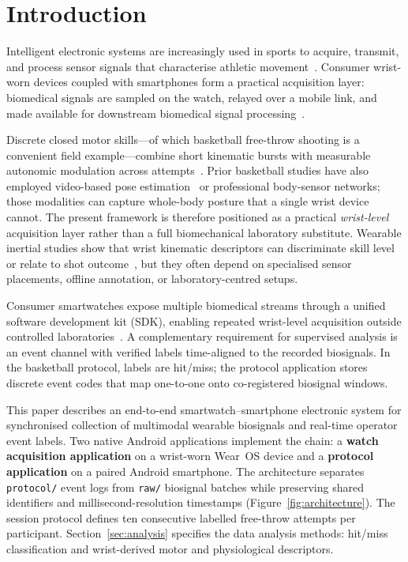 \documentclass[sensors,article,submit,pdftex,moreauthors]{Definitions/mdpi}
\begin{document}

\section{Introduction}



Intelligent electronic systems are increasingly used in sports to acquire, transmit, and process sensor signals that characterise athletic movement~\cite{Holgado2026,Casaccia2026}. Consumer wrist-worn devices coupled with smartphones form a practical acquisition layer: biomedical signals are sampled on the watch, relayed over a mobile link, and made available for downstream biomedical signal processing~\cite{Fyntikakis2026,Paolo2026}.



Discrete closed motor skills---of which basketball free-throw shooting is a convenient field example---combine short kinematic bursts with measurable autonomic modulation across attempts~\cite{Guo2023,Sonalcan2025}. Prior basketball studies have also employed video-based pose estimation~\cite{DENG2025,Zhao2022} or professional body-sensor networks; those modalities can capture whole-body posture that a single wrist device cannot. The present framework is therefore positioned as a practical \emph{wrist-level} acquisition layer rather than a full biomechanical laboratory substitute. Wearable inertial studies show that wrist kinematic descriptors can discriminate skill level or relate to shot outcome~\cite{Guo2023}, but they often depend on specialised sensor placements, offline annotation, or laboratory-centred setups.



Consumer smartwatches expose multiple biomedical streams through a unified software development kit (SDK), enabling repeated wrist-level acquisition outside controlled laboratories~\cite{Holgado2026,Fyntikakis2026}. A complementary requirement for supervised analysis is an event channel with verified labels time-aligned to the recorded biosignals. In the basketball protocol, labels are hit/miss; the protocol application stores discrete event codes that map one-to-one onto co-registered biosignal windows.



This paper describes an end-to-end smartwatch--smartphone electronic system for synchronised collection of multimodal wearable biosignals and real-time operator event labels. Two native Android applications implement the chain: a \textbf{watch acquisition application} on a wrist-worn Wear~OS device and a \textbf{protocol application} on a paired Android smartphone. The architecture separates \texttt{protocol/} event logs from \texttt{raw/} biosignal batches while preserving shared identifiers and millisecond-resolution timestamps (Figure~\ref{fig:architecture}). The session protocol defines ten consecutive labelled free-throw attempts per participant. Section~\ref{sec:analysis} specifies the data analysis methods: hit/miss classification and wrist-derived motor and physiological descriptors.
\end{document}
